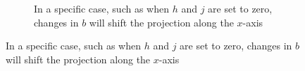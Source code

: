 \documentclass[11pt]{extarticle}
\begin{document}
\begin{figure}[!ht]
\begin{subfigure}{1\textwidth}
            \caption{In a specific case, such as when $h$ and $j$ are set to zero, changes in $b$ will shift the projection along the $x$-axis}
        \end{subfigure}
    \end{figure}
\end{document}
